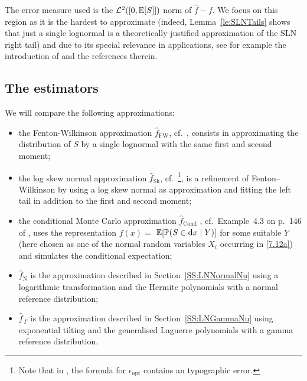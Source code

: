 The error measure used is the $\mathcal{L}^2([0, \operatorname{{\mathbb E}}[S]])$ norm of $\widehat{f}-f$. We focus on this region as
it is the hardest to approximate (indeed, Lemma~\ref{le:SLNTails} shows that just a single lognormal is a theoretically justified approximation of the SLN right tail) and due to its special relevance in applications, see for example the introduction of \cite {asmussen2015exponential} and the references therein.


\subsection{The estimators}
We will compare the following approximations:
\begin{itemize}
\item the Fenton-Wilkinson approximation $\widehat{f}_{\mathrm{FW}}$, cf.\ \cite{fenton1960sum}, consists in approximating the distribution of $S$ by a single lognormal
with the same first and second moment;
\item the log skew normal approximation $\widehat{f}_{\mathrm{Sk}}$,
cf.\ \cite{hcine2015highly}\footnote{Note that in \cite{hcine2015highly}, the formula for $\epsilon_{\mathrm{opt}}$ contains an typographic error.}, is a refinement of Fenton--Wilkinson by using a log  skew normal as approximation and fitting the left tail in addition to the first and second moment;
\item the conditional Monte Carlo approximation $\widehat{f}_{\mathrm{Cond}}$ , cf.\ Example~4.3 on p.\ 146 of \cite{asmussen2007stochastic}, uses the representation $f(x)=$
$\operatorname{{\mathbb E}}[\operatorname{{\mathbb P}}(S\in\mathop{}\!\mathrm{d} x \mid Y)]$ for some suitable $Y$ (here chosen as one of the
normal random variables $X_i$ occurring in \eqref{7.12a}) and simulates the conditional expectation;
\item $\widehat{f}_{\mathrm{N}}$ is the approximation described in Section~\ref{SS:LNNormalNu} using a logarithmic transformation
and the Hermite polynomials with a normal reference distribution;
\item $\widehat{f}_{\,\Gamma}$ is the approximation described in Section~\ref{SS:LNGammaNu} using exponential tilting and the generalised Laguerre polynomials with a gamma reference distribution.
\end{itemize}

